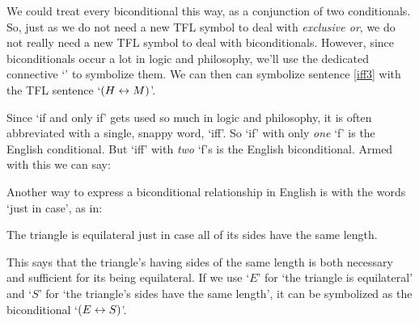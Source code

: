 We could treat every biconditional this way, as a conjunction of two conditionals. So, just as we do not need a new TFL symbol to deal with \emph{exclusive or}, we do not really need a new TFL symbol to deal with biconditionals. However, since biconditionals occur a lot in logic and philosophy, we'll use the dedicated connective `\eiff' to symbolize them. We can then can symbolize sentence \ref{iff3} with the TFL sentence `$(H \leftrightarrow M)$'.

Since `if and only if' gets used so much in logic and philosophy, it is often abbreviated with a single, snappy word, `iff'. So `if' with only \emph{one} `f' is the English conditional. But `iff' with \emph{two} `f's is the English biconditional. Armed with this we can say:

Another way to express a biconditional relationship in English is with the words `just in case', as in:
\begin{earg}
\item[\ex{iff2}] The triangle is equilateral just in case all of its sides have the same length.
\end{earg}
This says that the triangle's having sides of the same length is both necessary and sufficient for its being equilateral. If we use `$E$' for `the triangle is equilateral' and `$S$' for `the triangle's sides have the same length', it can be symbolized as the biconditional `$(E \leftrightarrow S)$'.




